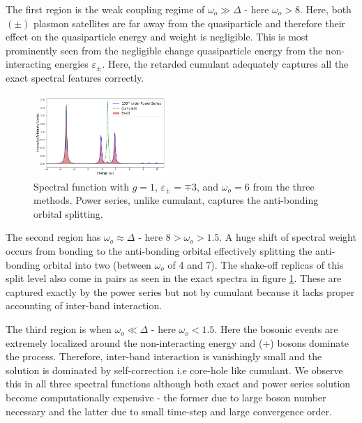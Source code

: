 \documentclass[%
 reprint,
 amsmath,amssymb,
 aps,prl,
floatfix
]{revtex4-2}
\begin{document}
 The first region is the weak coupling regime of $\omega_o\! \gg\! \Delta$ - here $\omega_o\!>\!8$. Here, both $(\pm)$ plasmon satellites are far away from the quasiparticle and therefore their effect on the quasiparticle energy and weight is negligible. This is most prominently seen from the negligible change quasiparticle energy from the non-interacting energies $\varepsilon_\pm$. Here, the retarded cumulant adequately captures all the exact spectral features correctly.
\begin{figure}[htp]
    \centering
    \includegraphics[height = 4.5 cm, width = 0.45\textwidth]{Spectra_at_boson_freq_6_emis.png}
    \caption{Spectral function with $g=1$, $\varepsilon_\pm = \mp3$, and $\omega_o =6$ from the three methods. Power series, unlike cumulant, captures the anti-bonding orbital splitting.}
    \label{omega_equals_delta}
\end{figure}

The second region has $\omega_o \approx \Delta$ - here $8>\omega_o>1.5$. A huge shift of spectral weight occurs from bonding to the anti-bonding orbital effectively splitting the anti-bonding orbital into two (between $\omega_o$ of 4 and 7). The shake-off replicas of this split level also come in pairs as seen in the exact spectra in figure \ref{omega_equals_delta}. These are captured exactly by the power series but not by cumulant because it lacks proper accounting of inter-band interaction.

The third region is when $\omega_o \ll \Delta$ - here $\omega_o < 1.5$. Here the bosonic events are extremely localized around the non-interacting energy and (+) bosons dominate the process. Therefore, inter-band interaction is vanishingly small and the solution is dominated by self-correction i.e core-hole like cumulant. We observe this in all three spectral functions although both exact and power series solution become computationally expensive -  the former due to large boson number necessary and the latter due to small time-step and large convergence order.

\end{document}
